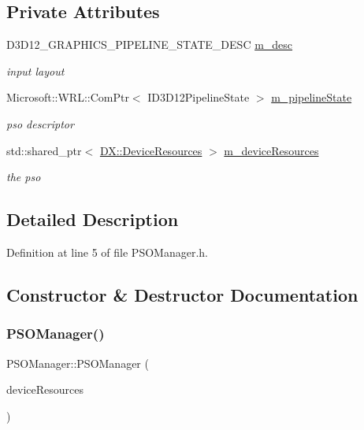 \subsection*{Private Attributes}
\begin{DoxyCompactItemize}
\item 
D3\+D12\+\_\+\+G\+R\+A\+P\+H\+I\+C\+S\+\_\+\+P\+I\+P\+E\+L\+I\+N\+E\+\_\+\+S\+T\+A\+T\+E\+\_\+\+D\+E\+SC \mbox{\hyperlink{class_p_s_o_manager_ac5a7e346b2d641709d7146f5a0f45dee}{m\+\_\+desc}}
\begin{DoxyCompactList}\small\item\em input layout \end{DoxyCompactList}\item 
Microsoft\+::\+W\+R\+L\+::\+Com\+Ptr$<$ I\+D3\+D12\+Pipeline\+State $>$ \mbox{\hyperlink{class_p_s_o_manager_aa34b6aa764012d33591474b456d1bfb7}{m\+\_\+pipeline\+State}}
\begin{DoxyCompactList}\small\item\em pso descriptor \end{DoxyCompactList}\item 
std\+::shared\+\_\+ptr$<$ \mbox{\hyperlink{class_d_x_1_1_device_resources}{D\+X\+::\+Device\+Resources}} $>$ \mbox{\hyperlink{class_p_s_o_manager_a0ea4be81328632e56d764e065b2af0af}{m\+\_\+device\+Resources}}
\begin{DoxyCompactList}\small\item\em the pso \end{DoxyCompactList}\end{DoxyCompactItemize}


\subsection{Detailed Description}


Definition at line 5 of file P\+S\+O\+Manager.\+h.



\subsection{Constructor \& Destructor Documentation}
\mbox{\label{class_p_s_o_manager_a0ada0797c36bd51e30d46af47e2785a3}} 
\subsubsection{\texorpdfstring{P\+S\+O\+Manager()}{PSOManager()}}
{\footnotesize\ttfamily P\+S\+O\+Manager\+::\+P\+S\+O\+Manager (\begin{DoxyParamCaption}\item[{const std\+::shared\+\_\+ptr$<$ \mbox{\hyperlink{class_d_x_1_1_device_resources}{D\+X\+::\+Device\+Resources}} $>$}]{device\+Resources }\end{DoxyParamCaption})}



